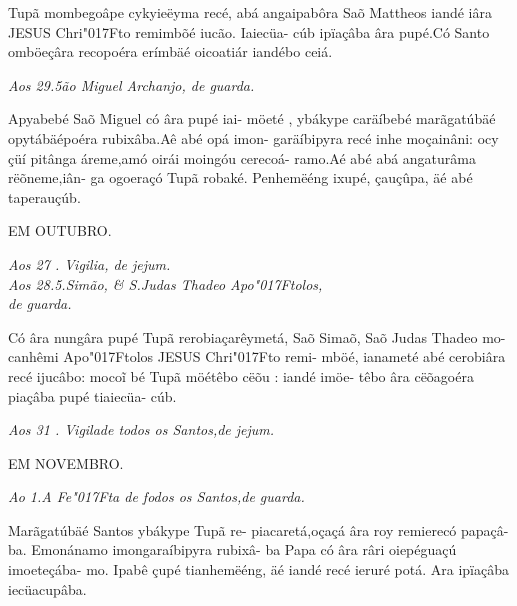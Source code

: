 \documentclass[openany,titlepage,12pt]{book}
\newcommand{\lgS}{\char"017F}
\begin{document}
{\hspace*{-2ex}Tupã mombegoâpe cykyieëyma recé,\linebreak
abá angaipabôra Saõ Mattheos iandé iâra
JESUS Chri\lgS to  remimbõé iucão. Iaiecüa-
cúb ipïaçâba âra pupé.Có Santo omböeçâra
recopoéra erímbäé oicoatiár iandébo ceiá.}

\begin{center}
    \textit{ \footnotesize Aos 29.5ão Miguel Archanjo, de guarda.}
\end{center}

{Apyabebé Saõ Miguel có âra pupé iai-
möeté , ybákype caräíbebé marãgatúbäé\linebreak
opytábäépoéra rubixâba.Aê abé opá imon-
garäíbipyra recé inhe moçainâni: ocy çüí
pitânga áreme,amó oirái moingóu cerecoá-
ramo.Aé abé abá angaturâma rëõneme,iân-
ga ogoeraçó Tupã robaké. Penhemëéng\linebreak
ixupé, çauçûpa, äé abé taperauçúb.
\newpage}


\begin{center}
    {EM OUTUBRO.\\}
\end{center}
\begin{center}
    \textit{\footnotesize Aos 27 . Vigilia, de jejum.\\
    Aos 28.5.Simão, \& S.Judas Thadeo Apo\lgS tolos,\\
    de guarda.}
\end{center}

{Có âra nungâra pupé Tupã rerobiaçarêymetá,
Saõ Simaõ, Saõ Judas Thadeo mo-
canhêmi Apo\lgS tolos JESUS Chri\lgS to  remi-\linebreak
mböé, ianameté abé cerobiâra recé ijucâbo:
moco\~i bé Tupã möétêbo cëõu : iandé imöe-
têbo âra cëõagoéra piaçâba pupé tiaiecüa-
cúb.}

\begin{center}
    \textit{\footnotesize Aos 31 . Vigilade todos os Santos,de jejum.}
\end{center}
\begin{center}
    {EM NOVEMBRO.\\}
\end{center}
\begin{center}
    \textit{\footnotesize Ao 1.A Fe\lgS ta de fodos os Santos,de guarda.}
\end{center}

{\hspace*{-2ex}Marãgatúbäé Santos ybákype Tupã re-\linebreak
piacaretá,oçaçá âra roy remierecó papaçâ-
ba. Emonánamo imongaraíbipyra rubixâ-
ba Papa có âra râri oiepéguaçú imoeteçába-
mo. Ipabê çupé tianhemëéng, äé iandé recé
ieruré potá. Ara ipïaçâba iecüacupâba.
\newpage}
\end{document}
